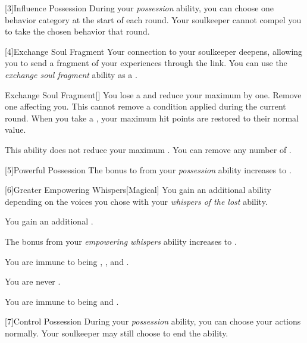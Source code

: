        [3]{Influence Possession} During your \textit{possession} ability, you can choose one behavior category at the start of each round.
        Your soulkeeper cannot compel you to take the chosen behavior that round.

        [4]{Exchange Soul Fragment} Your connection to your soulkeeper deepens, allowing you to send a fragment of your experiences through the link.
        You can use the \textit{exchange soul fragment} ability as a .
        \begin{freeability}{Exchange Soul Fragment}[]
            You lose a  and reduce your maximum  by one.
            Remove one  affecting you.
            This cannot remove a condition applied during the current round.
            When you take a , your maximum hit points are restored to their normal value.

            \rankline
             This ability does not reduce your maximum .
             You can remove any number of .
        \end{freeability}

        [5]{Powerful Possession} The bonus to  from your \textit{possession} ability increases to .

        [6]{Greater Empowering Whispers}[Magical] You gain an additional ability depending on the voices you chose with your \textit{whispers of the lost} ability.
        {
             You gain an additional .

             The bonus from your \textit{empowering whispers} ability increases to .

             You are immune to being , , and .

             You are never .

             You are immune to being  and .
        }

        [7]{Control Possession} During your \textit{possession} ability, you can choose your actions normally.
        Your soulkeeper may still choose to end the ability.
